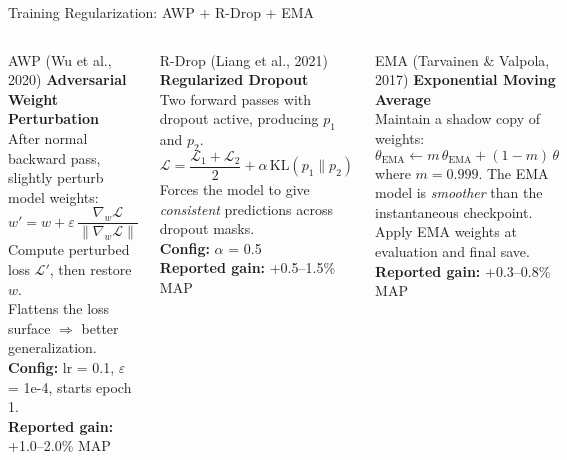 ﻿\documentclass[aspectratio=169,10pt]{beamer}
\begin{document}
\begin{frame}{Training Regularization: AWP + R-Drop + EMA}
\begin{columns}[T]
\begin{block}{AWP (Wu et al., 2020)}
\textbf{Adversarial Weight Perturbation}\\[4pt]
After normal backward pass, slightly perturb model weights:
\[
  w' = w + \varepsilon\,\frac{\nabla_w \mathcal{L}}{\|\nabla_w \mathcal{L}\|}
\]
Compute perturbed loss $\mathcal{L}'$, then restore $w$.\\[4pt]
Flattens the loss surface $\Rightarrow$ better generalization.\\[4pt]
\textbf{Config:} lr = 0.1, $\varepsilon$ = 1e-4, starts epoch 1.\\[4pt]
\textbf{Reported gain:} +1.0--2.0\% MAP
\end{block}
\begin{block}{R-Drop (Liang et al., 2021)}
\textbf{Regularized Dropout}\\[4pt]
Two forward passes with dropout active, producing $p_1$ and $p_2$.
\[
  \mathcal{L} = \frac{\mathcal{L}_1 + \mathcal{L}_2}{2} + \alpha\, \text{KL}(p_1 \| p_2)
\]
Forces the model to give \textit{consistent} predictions across dropout masks.\\[4pt]
\textbf{Config:} $\alpha$ = 0.5\\[4pt]
\textbf{Reported gain:} +0.5--1.5\% MAP
\end{block}
\begin{block}{EMA (Tarvainen \& Valpola, 2017)}
\textbf{Exponential Moving Average}\\[4pt]
Maintain a shadow copy of weights:
\[
  \theta_{\text{EMA}} \leftarrow m\,\theta_{\text{EMA}} + (1-m)\,\theta
\]
where $m = 0.999$. The EMA model is \textit{smoother} than the instantaneous checkpoint.\\[4pt]
Apply EMA weights at evaluation and final save.\\[4pt]
\textbf{Reported gain:} +0.3--0.8\% MAP
\end{block}
\end{columns}
\end{frame}
\end{document}

